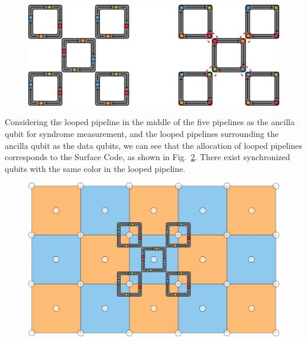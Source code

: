 \documentclass[a4paper,11pt]{ltjsarticle}
\begin{document}
{{        \begin{figure}[h]
            \centering
            \includegraphics[scale=0.30]{figure/looped_pipeline_surface_code.eps}
            \vspace{0pt}\caption{}
            \label{looped_pipeline_surface_code}
            \vspace{-10pt}
        \end{figure}

        Considering the looped pipeline in the middle of the five pipelines as the ancilla qubit for syndrome measurement, and the looped pipelines surrounding the ancilla qubit as the data qubits, we can see that the allocation of looped pipelines corresponds to the Surface Code, as shown in Fig.~\ref{looped_pipeline_weak_surface_code}. There exist synchronized qubits with the same color in the looped pipeline.

        \clearpage
        \begin{figure}[h]
            \centering
            \includegraphics[scale=0.20]{figure/looped_pipeline_weak_surface_code.eps}
            \vspace{0pt}\caption{}
            \label{looped_pipeline_weak_surface_code}
            \vspace{-10pt}
        \end{figure} 

}}
\end{document}
